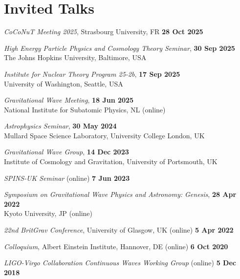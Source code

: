 \newcommand{\playsymbol}{$\blacktriangleright$}

\section{Invited Talks}

\secstartswithlist{}%
\begin{etaremune}
    \item \textit{CoCoNuT Meeting 2025}, Strasbourg University, FR \hfill \textbf{28 Oct 2025}
    \item \textit{High Energy Particle Physics and Cosmology Theory Seminar},
    \hfill \textbf{30 Sep 2025} \\
    The Johns Hopkins University, Baltimore, USA
    \item \textit{Institute for Nuclear Theory Program 25-2b},
    \hfill \textbf{17 Sep 2025} \\
    University of Washington, Seattle, USA
    \item \textit{Gravitational Wave Meeting}, \hfill \textbf{18 Jun 2025} \\
    National Institute for Subatomic Physics, NL (online)
    \item \textit{Astrophysics Seminar}, \hfill \textbf{30 May 2024} \\
    Mullard Space Science Laboratory, University College London, UK
    \item \textit{Gravitational Wave Group}, \hfill \textbf{14 Dec 2023} \\
    Institute of Cosmology and Gravitation, University of Portsmouth, UK
    \item \textit{SPINS-UK Seminar} (online) \hfill \textbf{7 Jun 2023}
    \item
    \textit{Symposium on Gravitational Wave Physics and Astronomy: Genesis},
    \hfill \textbf{28 Apr 2022} \\
    Kyoto University, JP (online)
    \item \textit{22nd BritGrav Conference}, University of Glasgow, UK (online)
    \hfill \textbf{5 Apr 2022}
    \item \textit{Colloquium}, Albert Einstein Institute, Hannover, DE (online)
    \hfill \textbf{6 Oct 2020}
    \item \textit{LIGO-Virgo Collaboration Continuous Waves Working Group}
    (online) \hfill \textbf{5 Dec 2018}
\end{etaremune}

